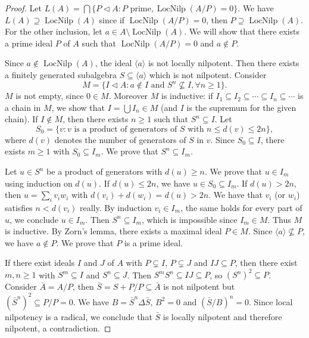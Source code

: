\documentclass{article}
\begin{document}
\begin{proof}
Let $L(A)=\bigcap\{P\triangleleft A : P \text{ prime}, \operatorname{LocNilp}(A/P)=0\}$.
We have $L(A)\supseteq \operatorname{LocNilp}(A)$ since if $\operatorname{LocNilp}(A/P)=0$, then $P\supseteq \operatorname{LocNilp}(A)$.
For the other inclusion, let $a\in A\setminus \operatorname{LocNilp}(A)$.
We will show that there exists a prime ideal $P$ of $A$ such that $\operatorname{LocNilp}(A/P)=0$ and $a\notin P$.

Since $a\notin \operatorname{LocNilp}(A)$, the ideal $\langle a\rangle$ is not locally nilpotent.
Then there exists a finitely generated subalgebra $S\subseteq \langle a\rangle$ which is not nilpotent.
Consider
\[
M=\{I\triangleleft A : a\notin I \text{ and } S^n\nsubseteq I, \forall n\geq 1\}.
\]
$M$ is not empty, since $0\in M$.
Moreover $M$ is inductive: if $I_1\subseteq I_2\subseteq \cdots \subseteq I_n\subseteq \cdots$ is a chain in $M$, we show that $I=\bigcup I_n\in M$ (and $I$ is the supremum for the given chain).
If $I\notin M$, then there exists $n\geq 1$ such that $S^n\subseteq I$.
Let
\[
S_0=\{v : v \text{ is a product of generators of } S \text{ with } n\leq d(v)\leq 2n\},
\]
where $d(v)$ denotes the number of generators of $S$ in $v$.
Since $S_0\subseteq I$, there exists $m\geq 1$ with $S_0\subseteq I_m$.
We prove that $S^n\subseteq I_m$.

Let $u\in S^n$ be a product of generators with $d(u)\geq n$.
We prove that $u\in I_m$ using induction on $d(u)$.
If $d(u)\leq 2n$, we have $u\in S_0\subseteq I_m$.
If $d(u)>2n$, then $u=\sum_i v_i w_i$ with $d(v_i)+d(w_i)=d(u)>2n$.
We have that $v_i$ (or $w_i$) satisfies $n<d(v_i)$ really.
By induction $v_i\in I_m$, the same holds for every part of $u$, we conclude $u\in I_m$.
Then $S^n\subseteq I_m$, which is impossible since $I_m\in M$.
Thus $M$ is inductive.
By Zorn's lemma, there exists a maximal ideal $P\in M$.
Since $\langle a\rangle\nsubseteq P$, we have $a\notin P$.
We prove that $P$ is a prime ideal.

If there exist ideals $I$ and $J$ of $A$ with $P\subsetneq I$, $P\subsetneq J$ and $IJ\subseteq P$, then there exist $m,n\geq 1$ with $S^m\subseteq I$ and $S^n\subseteq J$.
Then $S^m S^n\subseteq IJ\subseteq P$, so $(S^n)^2\subseteq P$.
Consider $\bar{A}=A/P$, then $\bar{S}=S+P/P\subseteq \bar{A}$ is not nilpotent but $(\bar{S}^n)^2\subseteq P/P=0$.
We have $B=\bar{S}^n\Delta \bar{S}$, $B^2=0$ and $(\bar{S}/B)^n=0$.
Since local nilpotency is a radical, we conclude that $\bar{S}$ is locally nilpotent and therefore nilpotent, a contradiction.
\end{proof}
\end{document}

